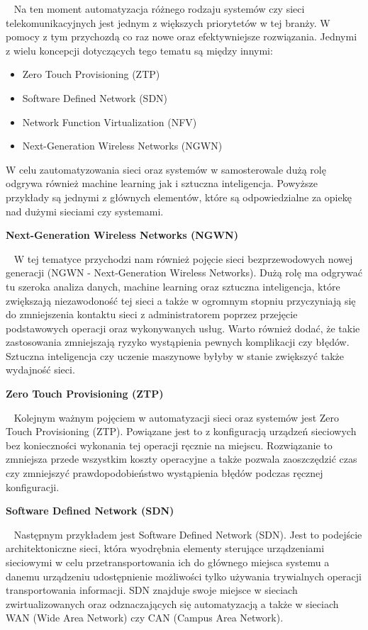 \documentclass[sn-mathphys,Numbered]{sn-jnl}
\theoremstyle{thmstyleone}%
\theoremstyle{thmstyletwo}%
\theoremstyle{thmstylethree}%
\begin{document}
~   Na ten moment automatyzacja różnego rodzaju systemów czy sieci telekomunikacyjnych jest jednym z większych priorytetów w tej branży. W pomocy z tym przychozdą co raz nowe oraz efektywniejsze rozwiązania. Jednymi z wielu koncepcji dotyczących tego tematu są między innymi:
\begin{itemize}
    \item Zero Touch Provisioning (ZTP)
    \item Software Defined Network (SDN)
    \item Network Function Virtualization (NFV)
    \item Next-Generation Wireless Networks (NGWN)
\end{itemize}
W celu zautomatyzowania sieci oraz systemów w samosterowale dużą rolę odgrywa również machine learning jak i sztuczna inteligencja. Powyższe przykłady są jednymi z głównych elementów, które są odpowiedzialne za opiekę nad dużymi sieciami czy systemami\cite{babaei_survey_2022}.
\begin{center}
    \bf Next-Generation Wireless Networks (NGWN)
\end{center}
~   W tej tematyce przychodzi nam również pojęcie sieci bezprzewodowych nowej generacji (NGWN - Next-Generation Wireless Networks). Dużą rolę  ma odgrywać tu szeroka analiza danych, machine learning oraz sztuczna inteligencja, które zwiększają niezawodoność tej sieci a także w ogromnym stopniu przyczyniają się do zmniejszenia kontaktu sieci z administratorem poprzez przejęcie podstawowych operacji oraz wykonywanych usług. Warto również dodać, że takie zastosowania zmniejszają ryzyko wystąpienia pewnych komplikacji czy błędów. Sztuczna inteligencja czy uczenie maszynowe byłyby w stanie zwiększyć także wydajność sieci\cite{babaei_survey_2022-1}.
\begin{center}
    \bf Zero Touch Provisioning (ZTP)
\end{center}
~   Kolejnym ważnym pojęciem w automatyzacji sieci oraz systemów jest Zero Touch Provisioning (ZTP). Powiązane jest to z konfiguracją urządzeń sieciowych bez konieczności wykonania tej operacji ręcznie na miejscu. Rozwiązanie to zmniejsza przede wszystkim koszty operacyjne a także pozwala zaoszczędzić czas czy zmniejszyć prawdopodobieństwo wystąpienia błędów podczas ręcznej konfiguracji\cite{noauthor_zero_2019}.

\begin{center}
    \bf Software Defined Network (SDN)
\end{center}
~   Następnym przykładem jest Software Defined Network (SDN). Jest to podejście architektoniczne sieci, która wyodrębnia elementy sterujące urządzeniami sieciowymi w celu przetransportowania ich do głównego miejsca systemu a danemu urządzeniu udostępnienie możliwości tylko używania trywialnych operacji transportowania informacji. SDN znajduje swoje miejsce w sieciach zwirtualizowanych oraz odznaczających się automatyzacją a także w sieciach WAN (Wide Area Network) czy CAN (Campus Area Network)\cite{guzenda_sieci_2020}.
\end{document}
